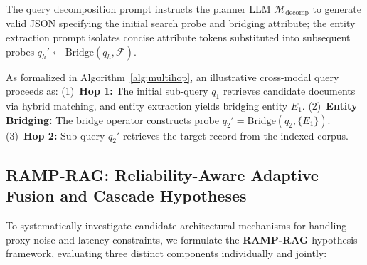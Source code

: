 \documentclass[conference]{IEEEtran}
\begin{document}
The query decomposition prompt instructs the planner LLM $\mathcal{M}_{\text{decomp}}$ to generate valid JSON specifying the initial search probe and bridging attribute; the entity extraction prompt isolates concise attribute tokens substituted into subsequent probes $q_h' \leftarrow \text{Bridge}(q_h, \mathcal{F})$.

As formalized in Algorithm~\ref{alg:multihop}, an illustrative cross-modal query proceeds as: (1)~\textbf{Hop 1:} The initial sub-query $q_1$ retrieves candidate documents via hybrid matching, and entity extraction yields bridging entity $E_1$. (2)~\textbf{Entity Bridging:} The bridge operator constructs probe $q_2' = \text{Bridge}(q_2, \{E_1\})$. (3)~\textbf{Hop 2:} Sub-query $q_2'$ retrieves the target record from the indexed corpus.

\subsection{RAMP-RAG: Reliability-Aware Adaptive Fusion and Cascade Hypotheses}
\label{sec:ramp_rag}
To systematically investigate candidate architectural mechanisms for handling proxy noise and latency constraints, we formulate the \textbf{RAMP-RAG} hypothesis framework, evaluating three distinct components individually and jointly:
\end{document}
